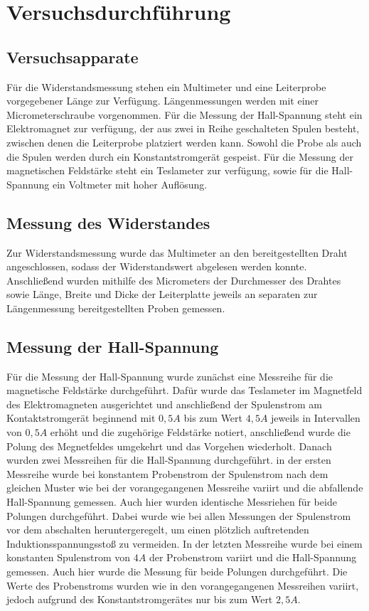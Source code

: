 \section{Versuchsdurchführung}
\subsection{Versuchsapparate}
Für die Widerstandsmessung stehen ein Multimeter und eine Leiterprobe vorgegebener Länge zur Verfügung. 
Längenmessungen werden mit einer Micrometerschraube vorgenommen. Für die Messung der Hall-Spannung steht 
ein Elektromagnet zur verfügung, der aus zwei in Reihe geschalteten Spulen besteht, zwischen denen die 
Leiterprobe platziert werden kann. Sowohl die Probe als auch die Spulen werden durch ein Konstantstromgerät 
gespeist. Für die Messung der magnetischen Feldstärke steht ein Teslameter zur verfügung, sowie für die 
Hall-Spannung ein Voltmeter mit hoher Auflösung.
\subsection{Messung des Widerstandes}
Zur Widerstandsmessung wurde das Multimeter an den bereitgestellten Draht angeschlossen, sodass der 
Widerstandswert abgelesen werden konnte. Anschließend wurden mithilfe des Micrometers der Durchmesser 
des Drahtes sowie Länge, Breite und Dicke der Leiterplatte jeweils an separaten zur Längenmessung 
bereitgestellten Proben gemessen.
\subsection{Messung der Hall-Spannung}
Für die Messung der Hall-Spannung wurde zunächst eine Messreihe für die magnetische Feldstärke durchgeführt. 
Dafür wurde das Teslameter im Magnetfeld des Elektromagneten ausgerichtet und anschließend der Spulenstrom 
am Kontaktstromgerät
beginnend mit $0,5A$ bis zum Wert $4,5A$ jeweils in Intervallen von $0,5A$ erhöht und die zugehörige 
Feldstärke notiert, anschließend wurde die Polung des Megnetfeldes umgekehrt und das Vorgehen wiederholt. 
Danach wurden zwei Messreihen für die Hall-Spannung durchgeführt. in der ersten Messreihe wurde bei konstantem 
Probenstrom der Spulenstrom nach dem gleichen Muster wie bei der vorangegangenen Messreihe variirt und die 
abfallende Hall-Spannung gemessen. Auch hier wurden identische Messriehen für beide Polungen durchgeführt. 
Dabei wurde wie bei allen Messungen der Spulenstrom vor dem abschalten heruntergeregelt, um einen plötzlich 
auftretenden Induktionsspannungsstoß zu vermeiden. In der letzten Messreihe wurde bei einem konstanten 
Spulenstrom von $4A$ der Probenstrom variirt und die Hall-Spannung gemessen. Auch hier wurde die Messung 
für beide Polungen durchgeführt. Die Werte des Probenstroms wurden wie in den vorangegangenen Messreihen 
variirt, jedoch aufgrund des Konstantstromgerätes nur bis zum Wert $2,5A$. 